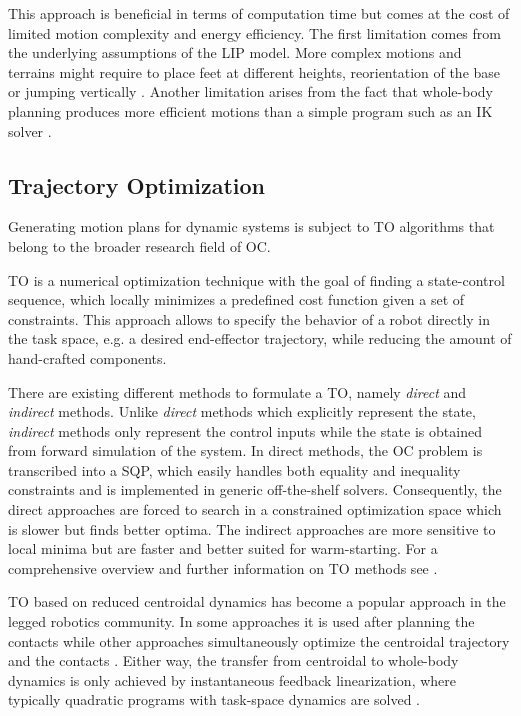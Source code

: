 This approach is beneficial in terms of computation time but comes at the cost of limited motion complexity and energy efficiency. 
The first limitation comes from the underlying assumptions of the \gls{LIP} model. More complex motions and terrains might require to place feet at different heights, reorientation of the base or jumping vertically \cite{winkler2018optimization}. Another limitation arises from the fact that whole-body planning produces more efficient motions than a simple program such as an \gls{IK} solver \cite{budhiraja2018differential}.   

\subsection{Trajectory Optimization}
Generating motion plans for dynamic systems is subject to \gls{TO} algorithms that belong to the broader research field of \gls{OC}. 

\gls{TO} is a numerical optimization technique with the goal of finding a state-control sequence, which locally minimizes a predefined cost function given a set of constraints. This approach allows to specify the behavior of a robot directly in the task space, e.g. a desired end-effector trajectory, while reducing the amount of hand-crafted components. 

There are existing different methods to formulate a \gls{TO}, namely \textit{direct} and \textit{indirect} methods. Unlike \textit{direct} methods which explicitly represent the state, \textit{indirect} methods only represent the control inputs while the state is obtained from forward simulation of the system. In direct methods, the \gls{OC} problem is transcribed into a \gls{SQP}, which easily handles both equality and inequality constraints and is implemented in generic off-the-shelf solvers. Consequently, the direct approaches are forced to search in a constrained optimization space which is slower but finds better optima. The indirect approaches are more sensitive to local minima but are faster and better suited for warm-starting. For a comprehensive overview and further information on \gls{TO} methods see \cite{betts1998survey, kelly2017transcription, tassa2014control}.

\gls{TO} based on reduced centroidal dynamics \cite{orin2013centroidal} has become a popular approach in the legged robotics community. In some approaches it is used after planning the contacts \cite{dai2014whole, carpentier2016versatile, herzog2015trajectory} while other approaches simultaneously optimize the centroidal trajectory and the contacts \cite{mastalli2017trajectory, winkler2018gait, aceituno2017simultaneous}. Either way, the transfer from centroidal to whole-body dynamics is only achieved by instantaneous feedback linearization, where typically quadratic programs with task-space dynamics are solved \cite{saab2013dynamic, herzog2016momentum, vaillant2016multi}. 

